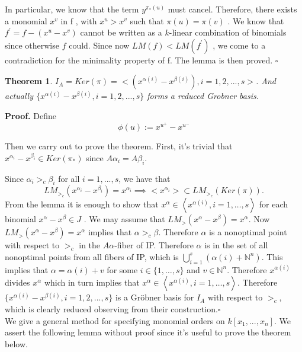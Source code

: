 \documentclass{article}
\theoremstyle{plain}
\newtheorem{theorem}{Theorem}[section]
\theoremstyle{definition}
\begin{document}
In particular, we know that the term  $y^{\pi_*(u)}$  must cancel. Therefore, there exists a monomial  $x^{v}$  in  f , with  $x^{u}>x^{v}$  such that  $\pi(u)=\pi(v)$ . We know that  $f^{\prime}=f-\left(x^{u}-x^{v}\right)$  cannot be written as a  $k$-linear combination of binomials since otherwise  $f$  could. Since now  $L M(f)<L M\left(f^{\prime}\right)$ , we come to a contradiction for the minimality property of  f. The lemma is then proved. \hfill $\square$ \\
 
\begin{theorem}$I_A = Ker(\pi) = <(x^{\alpha(i)}-x^{\beta(i)}),i=1,2,...,s>$. And actually $\{x^{\alpha(i)}-x^{\beta(i)},i=1,2,...,s\}$ forms a reduced Grobner basis. \end{theorem}

\noindent\textbf{Proof.} Define
$$\phi(u):=x^{u^+}-x^{u^-}$$

Then we carry out to prove the theorem. First, it's trivial that $x^{\alpha_i}-x^{\beta_i}\in Ker(\pi_*)$ since $A\alpha_i=A\beta_i$.

Since $\alpha_i >_c \beta_i$ for all $i= 1,...,s$, we have that 
$$ LM_{>_c}(x^{\alpha_i}-x^{\beta_i})=x^{\alpha_i} \implies \big<x^{\alpha_i}\big> \subset LM_{>_c}(Ker(\pi)).
$$From the lemma  it is enough to show that  $x^{\alpha} \in\left\langle x^{\alpha(i)}, i=1, \ldots, s\right\rangle$  for each binomial  $x^{\alpha}-x^{\beta} \in J$ . We may assume that $LM_{>}(x^{\alpha}-x^{\beta})=x^{\alpha}.$ Now  $LM_{>}\left(x^{\alpha}-x^{\beta}\right)=x^{\alpha}$  implies that  $\alpha>_{c} \beta$. Therefore  $\alpha$  is a nonoptimal point with respect to $ >_{c}$  in the  $A \alpha $-fiber of IP. Therefore  $\alpha$  is in the set of all nonoptimal points from all fibers of IP, which is $\bigcup_{i=1}^{s}\left(\alpha(i)+\mathbb{N}^{n}\right)$. This implies that  $\alpha=\alpha(i)+v$  for some  $i \in\{1, \ldots, s\}$  and  $v \in \mathbb{N}^{n}$. Therefore  $x^{\alpha(i)}$  divides  $x^{\alpha}$  which in turn implies that  $x^{\alpha} \in\left\langle x^{\alpha(i)}, i=1, \ldots, s\right\rangle$. Therefore  $\{x^{\alpha(i)}-x^{\beta(i)},i=1,2,...,s\}$  is a Gröbner basis for  $I_A$  with respect to  $>_{c}$, which is clearly reduced observing from their construction.\hfill $\square$ \\

We  give a general method for specifying monomial orders on $k[x_1, . . . , x_n]$.  We assert the following lemma  without proof since it's useful to prove the theorem below.
 
\end{document}
